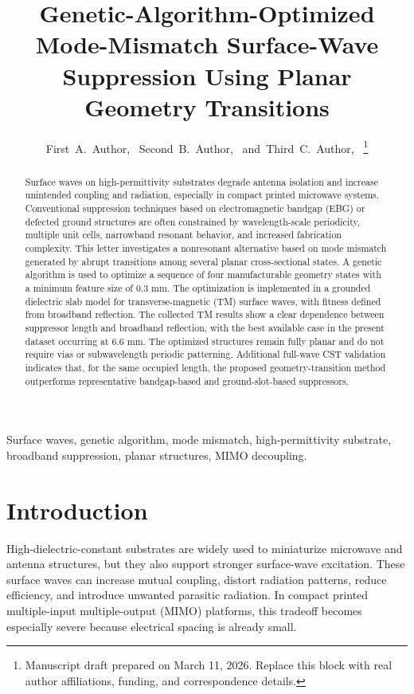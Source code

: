 \documentclass[journal]{IEEEtran}
\title{Genetic-Algorithm-Optimized Mode-Mismatch Surface-Wave Suppression Using Planar Geometry Transitions}
\author{First~A.~Author,~\IEEEmembership{Student Member,~IEEE,}
Second~B.~Author,~\IEEEmembership{Member,~IEEE,}
and~Third~C.~Author,~\IEEEmembership{Senior Member,~IEEE}
\thanks{Manuscript draft prepared on March 11, 2026. Replace this block with real author affiliations, funding, and correspondence details.}
}
\begin{document}
\maketitle

\begin{abstract}
Surface waves on high-permittivity substrates degrade antenna isolation and increase unintended coupling and radiation, especially in compact printed microwave systems. Conventional suppression techniques based on electromagnetic bandgap (EBG) or defected ground structures are often constrained by wavelength-scale periodicity, multiple unit cells, narrowband resonant behavior, and increased fabrication complexity. This letter investigates a nonresonant alternative based on mode mismatch generated by abrupt transitions among several planar cross-sectional states. A genetic algorithm is used to optimize a sequence of four manufacturable geometry states with a minimum feature size of 0.3 mm. The optimization is implemented in a grounded dielectric slab model for transverse-magnetic (TM) surface waves, with fitness defined from broadband reflection. The collected TM results show a clear dependence between suppressor length and broadband reflection, with the best available case in the present dataset occurring at 6.6 mm. The optimized structures remain fully planar and do not require vias or subwavelength periodic patterning. Additional full-wave CST validation indicates that, for the same occupied length, the proposed geometry-transition method outperforms representative bandgap-based and ground-slot-based suppressors.
\end{abstract}

\begin{IEEEkeywords}
Surface waves, genetic algorithm, mode mismatch, high-permittivity substrate, broadband suppression, planar structures, MIMO decoupling.
\end{IEEEkeywords}

\section{Introduction}
High-dielectric-constant substrates are widely used to miniaturize microwave and antenna structures, but they also support stronger surface-wave excitation. These surface waves can increase mutual coupling, distort radiation patterns, reduce efficiency, and introduce unwanted parasitic radiation. In compact printed multiple-input multiple-output (MIMO) platforms, this tradeoff becomes especially severe because electrical spacing is already small.
\end{document}
